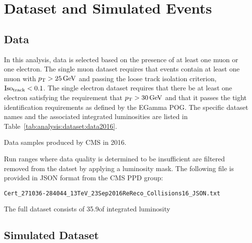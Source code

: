 \section{Dataset and Simulated Events}
\label{sec:analysis:dataset}


\subsection{Data}
\label{sec:analysis:dataset:data}

In this analysis, data is selected based on the presence of at least one muon or one electron. The single muon dataset requires that events contain at least one muon with $p_{\mathrm{T}} > 25\,\text{Ge\hspace{-.08em}V}$ and passing the loose track isolation criterion, $\rm Iso_{track} < 0.1$. The single electron dataset requires that there be at least one electron satisfying the requirement that $p_{\mathrm{T}} > 30\,\text{Ge\hspace{-.08em}V}$ and that it passes the tight identification requirements as defined by the EGamma POG.  The specific dataset names and the associated integrated luminosities are listed in Table~\ref{tab:analysis:dataset:data2016}.

\begin{table}[ht]
    \centering
    \setlength{\tabcolsep}{1em}
    \renewcommand{\arraystretch}{1.1}
    \caption{Data samples produced by CMS in 2016.} \label{tab:analysis:dataset:data2016}
    
\end{table}



\noindent Run ranges where data quality is determined to be insufficient are filtered removed from the datset by applying a luminosity mask. The following file is provided in JSON format from the CMS PPD group:

\texttt{Cert\_271036-284044\_13TeV\_23Sep2016ReReco\_Collisions16\_JSON.txt}

\noindent The full dataset consists of 35.9\fbinv of integrated luminosity~\cite{cms:lumi2016:CMS-PAS-LUM-17-001}




\subsection{Simulated Dataset}
\label{sec:analysis:dataset:simulation}

